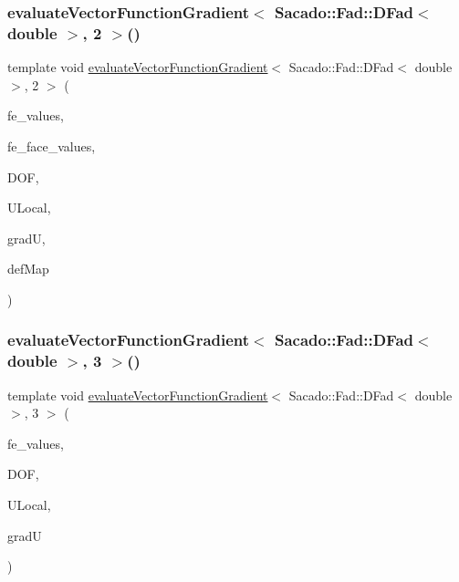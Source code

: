 \subsubsection{\texorpdfstring{evaluate\+Vector\+Function\+Gradient$<$ Sacado\+::\+Fad\+::\+D\+Fad$<$ double $>$, 2 $>$()}{evaluateVectorFunctionGradient< Sacado::Fad::DFad< double >, 2 >()}\hspace{0.1cm}{\footnotesize\ttfamily [4/4]}}
{\footnotesize\ttfamily template void \mbox{\hyperlink{group___evaluation_functions_ga9608539d601a91aff1ba01ccc720fbe0}{evaluate\+Vector\+Function\+Gradient}}$<$ Sacado\+::\+Fad\+::\+D\+Fad$<$ double $>$, 2 $>$ (\begin{DoxyParamCaption}\item[{const F\+E\+Values$<$ 2 $>$ \&}]{fe\+\_\+values,  }\item[{const F\+E\+Face\+Values$<$ 2 $>$ \&}]{fe\+\_\+face\+\_\+values,  }\item[{unsigned int}]{D\+OF,  }\item[{Table$<$ 1, Sacado\+::\+Fad\+::\+D\+Fad$<$ double $>$$>$ \&}]{U\+Local,  }\item[{Table$<$ 3, Sacado\+::\+Fad\+::\+D\+Fad$<$ double $>$$>$ \&}]{gradU,  }\item[{\mbox{\hyperlink{structdeformation_map}{deformation\+Map}}$<$ Sacado\+::\+Fad\+::\+D\+Fad$<$ double $>$, 2 $>$ \&}]{def\+Map }\end{DoxyParamCaption})}

\mbox{\label{function_evaluations_8cc_afdde5bc51307ce007f95ba2af9d138b2}} 
\subsubsection{\texorpdfstring{evaluate\+Vector\+Function\+Gradient$<$ Sacado\+::\+Fad\+::\+D\+Fad$<$ double $>$, 3 $>$()}{evaluateVectorFunctionGradient< Sacado::Fad::DFad< double >, 3 >()}\hspace{0.1cm}{\footnotesize\ttfamily [1/4]}}
{\footnotesize\ttfamily template void \mbox{\hyperlink{group___evaluation_functions_ga9608539d601a91aff1ba01ccc720fbe0}{evaluate\+Vector\+Function\+Gradient}}$<$ Sacado\+::\+Fad\+::\+D\+Fad$<$ double $>$, 3 $>$ (\begin{DoxyParamCaption}\item[{const F\+E\+Values$<$ 3 $>$ \&}]{fe\+\_\+values,  }\item[{unsigned int}]{D\+OF,  }\item[{Table$<$ 1, Sacado\+::\+Fad\+::\+D\+Fad$<$ double $>$$>$ \&}]{U\+Local,  }\item[{Table$<$ 3, Sacado\+::\+Fad\+::\+D\+Fad$<$ double $>$$>$ \&}]{gradU }\end{DoxyParamCaption})}

